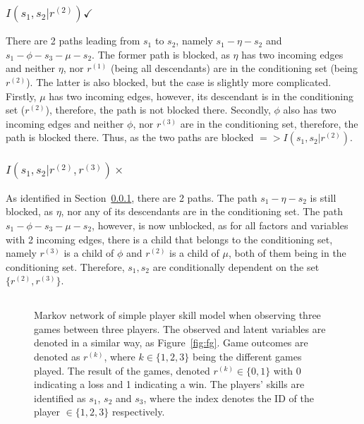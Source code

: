 \documentclass[a4paper,11pt]{article}
\theoremstyle{mytheor}
\begin{document}
\subsubsection{$I(s_1,s_2|r^{(2)})\checkmark$} 
\label{sec:first_indep}
There are 2 paths leading from $s_1$ to $s_2$, namely $s_1-\eta-s_2$ and $s_1-\phi-s_3-\mu-s_2$. The former path is blocked, as $\eta$ has two incoming edges and neither $\eta$, nor $r^{(1)}$ (being all descendants) are in the conditioning set (being $r^{(2)}$). The latter is also blocked, but the case is slightly more complicated. Firstly, $\mu$ has two incoming edges, however, its descendant is in the conditioning set ($r^{(2)}$), therefore, the path is not blocked there. Secondly, $\phi$ also has two incoming edges and neither $\phi$, nor $r^{(3)}$ are in the conditioning set, therefore, the path is blocked there.
Thus, as the two paths are blocked $=> I(s_1,s_2|r^{(2)})$.
\subsubsection{$I(s_1,s_2|r^{(2)},r^{(3)})\times$}
As identified in Section~\ref{sec:first_indep}, there are 2 paths. The path $s_1-\eta-s_2$ is still blocked, as $\eta$, nor any of its descendants are in the conditioning set. The path $s_1-\phi-s_3-\mu-s_2$, however, is now unblocked, as for all factors and variables with 2 incoming edges, there is a child that belongs to the conditioning set, namely $r^{(3)}$ is a child of $\phi$ and $r^{(2)}$ is a child of $\mu$, both of them being in the conditioning set. Therefore, $s_1,s_2$ are conditionally dependent on the set $\{r^{(2)},r^{(3)}\}$.
\subsection{}
\begin{figure}[htpb!]
    \centering
    \caption{Markov network of simple player skill model when observing three games between three players. The observed and latent variables are denoted in a similar way, as Figure~\ref{fig:fg}. Game outcomes are denoted as $r^{(k)}$, where $k\in{\{1,2,3\}}$ being the different games played. The result of the games, denoted $r^{(k)}\in{\{0,1\}}$ with 0 indicating a loss and 1 indicating a win. The players' skills are identified as $s_1$, $s_2$ and $s_3$, where the index denotes the ID of the player $\in{\{1,2,3\}}$ respectively.}
    \label{fig:mn}
\end{figure}
\end{document}
